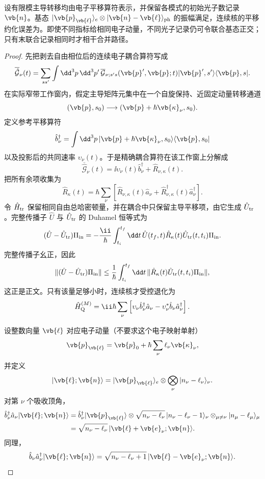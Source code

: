\begin{proposition}[多模固定交换记录的联合振幅格]
设有限模主导转移均由电子平移算符表示，并保留各模式的初始光子数记录 $\vb{n}$。基态 $|\vb{p}_{\vb{\ell}}\rangle_e\otimes|\vb{n}-\vb{\ell}\rangle_{\rm ph}$ 的振幅满足，连续核的平移约化误差为。即使不同指标给相同电子动量，不同光子记录仍可令联合基态正交；只有末联合记录相同时才相干合并路径。
\end{proposition}
\begin{proof}
先把剥去自由相位后的连续电子耦合算符写成
\[
\overline{\hat{\mathcal G}}_\nu(t)
=
\sum_{ss'}
\int\dd^3p\,\dd^3p'\,
\overline{\mathcal G}_{\nu;s's}(\vb{p}',\vb{p};t)
|\vb{p}',s'\rangle\langle\vb{p},s|.
\]
在实际窄带工作窗内，假定主导矩阵元集中在一个自旋保持、近固定动量转移通道
\[
(\vb{p},s_0)
\longrightarrow
(\vb{p}+\hbar\vb{\kappa}_\nu,s_0).
\]
定义参考平移算符
\[
\hat b_\nu^\dagger
=
\int\dd^3p\,
|\vb{p}+\hbar\vb{\kappa}_\nu,s_0\rangle
\langle\vb{p},s_0|
\]
以及投影后的共同速率 $\upsilon_\nu(t)$。于是精确耦合算符在该工作窗上分解成
\[
\overline{\hat{\mathcal G}}_\nu(t)
=
\ii\upsilon_\nu(t)\hat b_\nu^\dagger
+
\hat R_{\nu,\kappa}(t).
\]
把所有余项收集为
\[
\hat R_\kappa(t)
=
\hbar
\sum_\nu
\left[
\hat R_{\nu,\kappa}(t)\hat a_\nu
+
\hat R_{\nu,\kappa}^\dagger(t)\hat a_\nu^\dagger
\right].
\]
令 $\hat H_{\rm tr}$ 保留相同自由总哈密顿量，并在耦合中只保留主导平移项，由它生成 $\hat U_{\rm tr}$。完整传播子 $\hat U$ 与 $\hat U_{\rm tr}$ 的 Duhamel 恒等式为
\[
(\hat U-\hat U_{\rm tr})\Pi_{\rm in}
=
-\frac{\ii}{\hbar}
\int_{t_i}^{t_f}\dd t\,
\hat U(t_f,t)
\hat R_\kappa(t)
\hat U_{\rm tr}(t,t_i)\Pi_{\rm in}.
\]
完整传播子幺正，因此
\[
\|(\hat U-\hat U_{\rm tr})\Pi_{\rm in}\|
\le
\frac1\hbar
\int_{t_i}^{t_f}\dd t\,
\|
\hat R_\kappa(t)
\hat U_{\rm tr}(t,t_i)\Pi_{\rm in}
\|,
\]
这正是正文。只有该量足够小时，连续核才受控退化为
\[
\hat H_{\rm Q}^{(M)}
=
\ii\hbar\sum_\nu
\left[
\upsilon_\nu\hat b_\nu^\dagger\hat a_\nu
-\upsilon_\nu^*\hat b_\nu\hat a_\nu^\dagger
\right].
\]

设整数向量 $\vb{\ell}$ 对应电子动量（不要求这个电子映射单射）
\[
\vb{p}_{\vb{\ell}}
=
\vb{p}_0
+\hbar\sum_\nu\ell_\nu\vb{\kappa}_\nu,
\]
并定义
\[
|\vb{\ell};\vb{n}\rangle
=
|\vb{p}_{\vb{\ell}}\rangle_e
\otimes
\bigotimes_\nu
|n_\nu-\ell_\nu\rangle_\nu .
\]
对第 $\nu$ 个吸收顶角，
\begin{align*}
\hat b_\nu^\dagger\hat a_\nu
|\vb{\ell};\vb{n}\rangle
&=
\hat b_\nu^\dagger
|\vb{p}_{\vb{\ell}}\rangle
\otimes
\sqrt{n_\nu-\ell_\nu}\,
|n_\nu-\ell_\nu-1\rangle_\nu
\otimes_{\mu\neq\nu}
|n_\mu-\ell_\mu\rangle_\mu\\
&=
\sqrt{n_\nu-\ell_\nu}\,
|\vb{\ell}+\vb{e}_\nu;\vb{n}\rangle .
\end{align*}
同理，
\[
\hat b_\nu\hat a_\nu^\dagger
|\vb{\ell};\vb{n}\rangle
=
\sqrt{n_\nu-\ell_\nu+1}\,
|\vb{\ell}-\vb{e}_\nu;\vb{n}\rangle .
\]


\end{proof}
